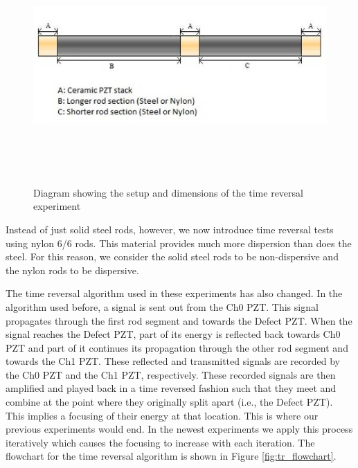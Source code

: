 \documentclass[]{aiaa-tc}%
\begin{document}
\begin{figure}[H]%
\centering
 \includegraphics[height = 9cm]{tr_setup}
 \caption{Diagram showing the setup and dimensions of the time reversal experiment}
 \label{fig:tr_dimensions}
\end{figure}

Instead of just solid steel rods, however, we now introduce time reversal tests using nylon 6/6 rods. This material provides much more dispersion than does the steel. For this reason, we consider the solid steel rods to be non-dispersive and the nylon rods to be dispersive.

The time reversal algorithm used in these experiments has also changed. In the algorithm used before, a signal is sent out from the Ch0 PZT. This signal propagates through the first rod segment and towards the Defect PZT. When the signal reaches the Defect PZT, part of its energy is reflected back towards Ch0 PZT and part of it continues its propagation through the other rod segment and towards the Ch1 PZT. These reflected and transmitted signals are recorded by the Ch0 PZT and the Ch1 PZT, respectively. These recorded signals are then amplified and played back in a time reversed fashion such that they meet and combine at the point where they originally split apart (i.e., the Defect PZT). This implies a focusing of their energy at that location. This is where our previous experiments would end. In the newest experiments we apply this process iteratively which causes the focusing to increase with each iteration. The flowchart for the time reversal algorithm is shown in Figure \ref{fig:tr_flowchart}.
\end{document}
